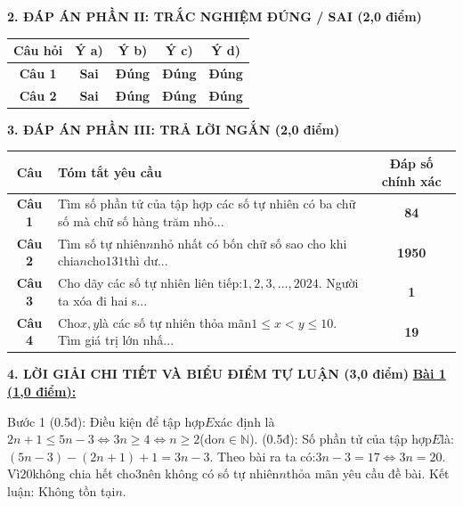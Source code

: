 \documentclass[11pt,a4paper]{article}
\begin{document}
\noindent\textbf{\large 2. ĐÁP ÁN PHẦN II: TRẮC NGHIỆM ĐÚNG / SAI (2,0 điểm)}
\vspace{4pt}
\begin{center}
\begin{tabular}{|c|c|c|c|c|}
\hline
\textbf{Câu hỏi} & \textbf{Ý a)} & \textbf{Ý b)} & \textbf{Ý c)} & \textbf{Ý d)} \\
\hline
\textbf{Câu 1} & \textbf{Sai} & \textbf{Đúng} & \textbf{Đúng} & \textbf{Đúng} \\
\hline
\textbf{Câu 2} & \textbf{Sai} & \textbf{Đúng} & \textbf{Đúng} & \textbf{Đúng} \\
\hline
\end{tabular}
\end{center}
\vspace{6pt}


\noindent\textbf{\large 3. ĐÁP ÁN PHẦN III: TRẢ LỜI NGẮN (2,0 điểm)}
\vspace{4pt}
\begin{center}
\begin{tabular}{|c|m{11cm}|c|}
\hline
\textbf{Câu} & \textbf{Tóm tắt yêu cầu} & \textbf{Đáp số chính xác} \\
\hline
\textbf{Câu 1} & Tìm số phần tử của tập hợp các số tự nhiên có ba chữ số mà chữ số hàng trăm nhỏ... & \textbf{84} \\
\hline
\textbf{Câu 2} & Tìm số tự nhiên$n$nhỏ nhất có bốn chữ số sao cho khi chia$n$cho$131$thì dư... & \textbf{1950} \\
\hline
\textbf{Câu 3} & Cho dãy các số tự nhiên liên tiếp:$1, 2, 3, \dots, 2024$. Người ta xóa đi hai s... & \textbf{1} \\
\hline
\textbf{Câu 4} & Cho$x, y$là các số tự nhiên thỏa mãn$1 \le x < y \le 10$. Tìm giá trị lớn nhấ... & \textbf{19} \\
\hline
\end{tabular}
\end{center}
\vspace{6pt}


\noindent\textbf{\large 4. LỜI GIẢI CHI TIẾT VÀ BIỂU ĐIỂM TỰ LUẬN (3,0 điểm)}
\vspace{4pt}
\noindent\textbf{\underline{Bài 1 (1,0 điểm):}}\par\vspace{3pt}
Bước 1 (0.5đ): Điều kiện để tập hợp$E$xác định là$2n + 1 \le 5n - 3 \Leftrightarrow 3n \ge 4 \Leftrightarrow n \ge 2$(do$n \in \mathbb{N}$). (0.5đ): Số phần tử của tập hợp$E$là:$(5n - 3) - (2n + 1) + 1 = 3n - 3$. Theo bài ra ta có:$3n - 3 = 17 \Leftrightarrow 3n = 20$. Vì$20$không chia hết cho$3$nên không có số tự nhiên$n$thỏa mãn yêu cầu đề bài. Kết luận: Không tồn tại$n$.\par\vspace{8pt}
\end{document}
